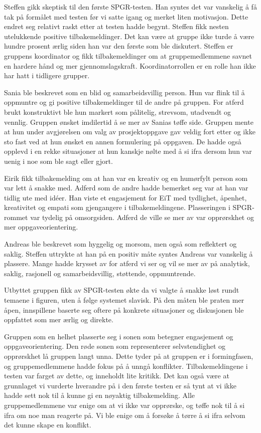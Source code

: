 \documentclass[a4paper,norsk,oneside]{article}
\begin{document}
Steffen gikk skeptisk til den første SPGR-testen. Han syntes det var vanskelig å få tak på formålet med testen før vi satte igang og merket liten motivasjon. Dette endret seg relativt raskt etter at testen hadde begynt. Steffen fikk nesten utelukkende positive tilbakemeldinger. Det kan være at gruppe ikke turde å være hundre prosent ærlig siden han var den første som ble diskutert. Steffen er gruppens koordinator og fikk tilbakemeldinger om at gruppemedlemmene savnet en hardere hånd og mer gjennomslagskraft. Koordinatorrollen er en rolle han ikke har hatt i tidligere grupper.

Sania ble beskrevet som en blid og samarbeidsvillig person. Hun var flink til å oppmuntre og gi positive tilbakemeldinger til de andre på gruppen. For atferd brukt konstruktivt ble hun markert som pålitelig, strevsom, utadvendt og vennlig. Gruppen ønsket imdilertid å se mer av Sanias tøffe side. Gruppen mente at hun under avgjørelsen om valg av prosjektoppgave gav veldig fort etter og ikke sto fast ved at hun ønsket en annen formulering på oppgaven. De hadde også opplevd i en rekke situasjoner at hun kanskje nølte med å si ifra dersom hun var uenig i noe som ble sagt eller gjort. 

Eirik fikk tilbakemelding om at han var en kreativ og en humørfylt person som var lett å snakke med. Adferd som de andre hadde bemerket seg var at han var tidlig ute med idéer. Han viste et engasjement for EiT med tydlighet, åpenhet, kreativitet og empati som gjengangere i tilbakemeldingene. Plasseringen i SPGR-rommet var tydelig på omsorgsiden. Adferd de ville se mer av var opprørskhet og mer oppgaveorientering. 

Andreas ble beskrevet som hyggelig og morsom, men også som reflektert og saklig. Steffen uttrykte at han på en positiv måte syntes Andreas var vanskelig å plassere. Mange hadde krysset av for atferd vi ser og vil se mer av på analytisk, saklig, rasjonell og samarbeidsvillig, støttende, oppmuntrende.


Utbyttet gruppen fikk av SPGR-testen økte da vi valgte å snakke løst rundt temaene i figuren, uten å følge systemet slavisk. På den måten ble praten mer åpen, innspillene baserte seg oftere på konkrete situasjoner og diskusjonen ble oppfattet som mer ærlig og direkte. 

Gruppen som en helhet plasserte seg i sonen som betegner engasjement og oppgaveorientering. Den røde sonen som representerer selvstendighet og opprørskhet lå gruppen langt unna. Dette tyder på at gruppen er i formingfasen, og gruppemedlemmene hadde fokus på å unngå konflikter. Tilbakemeldingene i testen var farget av dette, og inneholdt lite kritikk. Det kan også være at grunnlaget vi vurderte hverandre på i den første testen er så tynt at vi ikke hadde sett nok til å kunne gi en nøyaktig tilbakemelding. Alle gruppemedlemmene var enige om at vi ikke var opprørske, og tøffe nok til å si ifra om noe man reagerte på. Vi ble enige om å forsøke å tørre å si ifra selvom det kunne skape en konflikt. 
\end{document}
